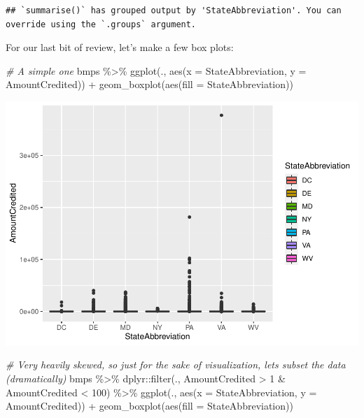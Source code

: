 \documentclass[]{article}
\newenvironment{Shaded}{\begin{snugshade}}{\end{snugshade}}
\newcommand{\AttributeTok}[1]{\textcolor[rgb]{0.77,0.63,0.00}{#1}}
\newcommand{\CommentTok}[1]{\textcolor[rgb]{0.56,0.35,0.01}{\textit{#1}}}
\newcommand{\DecValTok}[1]{\textcolor[rgb]{0.00,0.00,0.81}{#1}}
\newcommand{\FunctionTok}[1]{\textcolor[rgb]{0.00,0.00,0.00}{#1}}
\newcommand{\NormalTok}[1]{#1}
\newcommand{\SpecialCharTok}[1]{\textcolor[rgb]{0.00,0.00,0.00}{#1}}
\begin{document}
\begin{verbatim}
## `summarise()` has grouped output by 'StateAbbreviation'. You can override using the `.groups` argument.
\end{verbatim}

For our last bit of review, let's make a few box plots:

\begin{Shaded}
\begin{Highlighting}[]
\CommentTok{\# A simple one}
\NormalTok{bmps }\SpecialCharTok{\%\textgreater{}\%} \FunctionTok{ggplot}\NormalTok{(., }\FunctionTok{aes}\NormalTok{(}\AttributeTok{x =}\NormalTok{ StateAbbreviation, }\AttributeTok{y =}\NormalTok{ AmountCredited)) }\SpecialCharTok{+}
  \FunctionTok{geom\_boxplot}\NormalTok{(}\FunctionTok{aes}\NormalTok{(}\AttributeTok{fill =}\NormalTok{ StateAbbreviation))}
\end{Highlighting}
\end{Shaded}

\includegraphics{lab02_files/figure-latex/review3-1.pdf}

\begin{Shaded}
\begin{Highlighting}[]
\CommentTok{\# Very heavily skewed, so just for the sake of visualization, let\textquotesingle{}s subset the data (dramatically)}
\NormalTok{bmps }\SpecialCharTok{\%\textgreater{}\%} 
\NormalTok{  dplyr}\SpecialCharTok{::}\FunctionTok{filter}\NormalTok{(., AmountCredited }\SpecialCharTok{\textgreater{}} \DecValTok{1} \SpecialCharTok{\&}\NormalTok{ AmountCredited }\SpecialCharTok{\textless{}} \DecValTok{100}\NormalTok{) }\SpecialCharTok{\%\textgreater{}\%} 
  \FunctionTok{ggplot}\NormalTok{(., }\FunctionTok{aes}\NormalTok{(}\AttributeTok{x =}\NormalTok{ StateAbbreviation, }\AttributeTok{y =}\NormalTok{ AmountCredited)) }\SpecialCharTok{+}
  \FunctionTok{geom\_boxplot}\NormalTok{(}\FunctionTok{aes}\NormalTok{(}\AttributeTok{fill =}\NormalTok{ StateAbbreviation))}
\end{Highlighting}
\end{Shaded}
\end{document}
